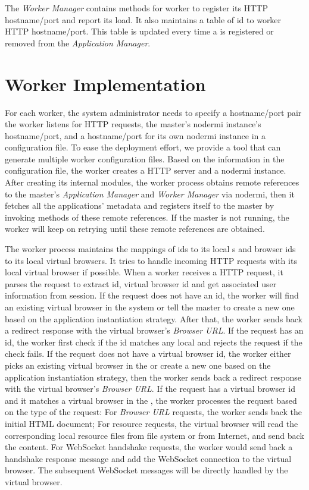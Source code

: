 The \emph{Worker Manager} contains methods for worker to register its HTTP
hostname/port and report its load. It also maintains a table of \appins{} id
to worker HTTP hostname/port. This table is updated every time a \appins{}
is registered or removed from the \emph{Application Manager}.




\section{Worker Implementation}
\label{sec:worker}

For each worker, the system administrator needs to specify a hostname/port
pair the worker listens for HTTP requests,  the master's nodermi instance's
hostname/port, and a hostname/port for its own nodermi instance in a
configuration file. To ease the deployment effort, we provide a tool that can
generate multiple worker configuration files. Based on the information in the
configuration file, the worker creates a HTTP server and a nodermi instance.
After creating its internal modules, the worker process obtains remote
references to the master's \emph{Application Manager} and \emph{Worker
Manager} via nodermi, then  it fetches all the applications' metadata and
registers itself to the master by invoking methods of these remote references.
If the master is not running, the worker will keep on retrying until these
remote references are obtained.


The worker process maintains the mappings of \appins{} ids to its local
\appins{}s and browser ids to its local virtual browsers.
It tries to handle incoming HTTP requests with its local virtual browser
if possible.
When a worker receives a HTTP request, it parses the request to extract
\appins id, virtual browser id and get associated user information
from session. If the request does not
have an \appins id, the worker will find an existing virtual browser in the
system or tell the master to create a new one based on the application
instantiation strategy. After
that, the worker sends back a redirect response with the virtual browser's
\emph{Browser URL}. If the request has an \appins id, the worker first check
if the id matches any local \appins and rejects the request if the check
fails. If the request does not have a virtual browser id, the worker either
picks an existing virtual browser in the \appins  or create a new one based on
the application instantiation strategy, then the worker sends back a redirect
response with  the virtual browser's \emph{Browser URL}. If the request has a
virtual browser id and it matches a virtual browser in the \appins, the worker
processes the request based on the type of the request: For \emph{Browser URL}
requests, the worker sends back the initial  HTML document; For resource
requests, the virtual browser will read the corresponding local resource files
from file system or from Internet, and send back the content. For WebSocket
handshake requests, the worker would send back a handshake response message
and add the WebSocket connection to the virtual browser.
The subsequent WebSocket messages will be directly handled by the virtual browser.



